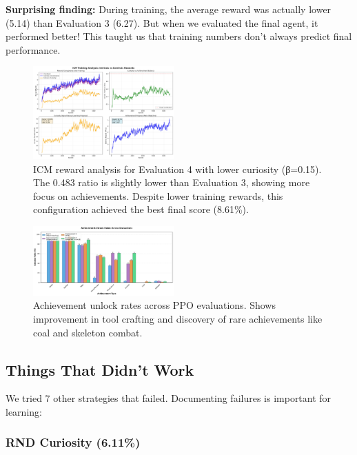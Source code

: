 \documentclass[conference]{IEEEtran}
\begin{document}
\textbf{Surprising finding:} During training, the average reward was actually lower (5.14) than Evaluation 3 (6.27). But when we evaluated the final agent, it performed better! This taught us that training numbers don't always predict final performance.

\begin{figure}[h!]
\centering
\includegraphics[width=0.48\textwidth]{fig7_icm_improvement3.pdf}
\caption{ICM reward analysis for Evaluation 4 with lower curiosity (β=0.15). The 0.483 ratio is slightly lower than Evaluation 3, showing more focus on achievements. Despite lower training rewards, this configuration achieved the best final score (8.61\%).}
\label{fig:icm_eval4}
\end{figure}

\begin{figure}[h!]
\centering
\includegraphics[width=0.48\textwidth]{fig2_achievement_comparison.pdf}
\caption{Achievement unlock rates across PPO evaluations. Shows improvement in tool crafting and discovery of rare achievements like coal and skeleton combat.}
\label{fig:achievements}
\end{figure}

\subsection{Things That Didn't Work}

We tried 7 other strategies that failed. Documenting failures is important for learning:

\subsubsection{RND Curiosity (6.11\%)}
\end{document}
